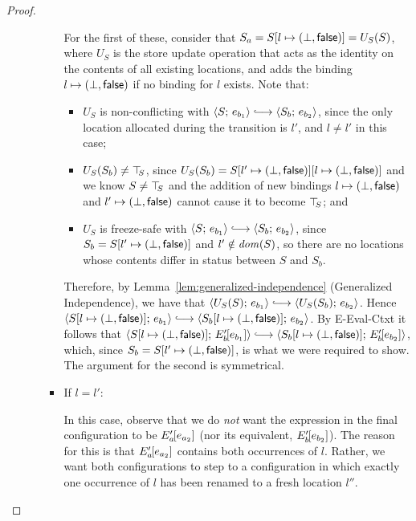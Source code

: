 \begin{proof}
\begin{enumerate}
\begin{enumerate}
\begin{itemize}
          For the first of these, consider that $S_a =
          S[l \mapsto (\bot, \textsf{false})] = U_S(S)$, where $U_S$ is
          the store update operation that acts as the identity on the
          contents of all existing locations, and adds the binding
          $l \mapsto (\bot, \textsf{false})$ if no binding for $l$
          exists.  Note that:
          \begin{itemize}
          \item $U_S$ is non-conflicting with $\config{S}{e_{b_1}}
            \parstepsto \config{S_b}{e_{b_2}}$, since the only
            location allocated during the transition is $l'$, and $l
            \neq l'$ in this case;
          \item $U_S(S_b) \neq \top\hspace{-0.85mm}_{S}$, since $U_S(S_b) =
            S[l' \mapsto (\bot, \textsf{false})][l \mapsto (\bot, \textsf{false})]$
            and we know $S \neq \top\hspace{-0.85mm}_{S}$ and the addition of new
            bindings $l \mapsto (\bot, \textsf{false})$ and
            $l' \mapsto (\bot, \textsf{false})$ cannot cause it to
            become $\top\hspace{-0.85mm}_{S}$; and
          \item $U_S$ is freeze-safe with $\config{S}{e_{b_1}}
            \parstepsto \config{S_b}{e_{b_2}}$, since $S_b =
            S[l' \mapsto (\bot, \textsf{false})]$ and $l' \notin \mathit{dom}(S)$,
            so there are no locations whose contents differ in status
            between $S$ and $S_b$.
          \end{itemize}

          Therefore, by Lemma~\ref{lem:generalized-independence}
          (Generalized Independence), we have that
          $\config{U_S(S)}{e_{b_1}} \parstepsto
          \config{U_S(S_b)}{e_{b_2}}$.  Hence
          $\config{\extS{S}{l}{\bot}{\frozenfalse}}{e_{b_1}}
          \parstepsto
          \config{\extS{S_b}{l}{\bot}{\frozenfalse}}{e_{b_2}}$.  By
                 {\sc E-Eval-Ctxt} it follows that
                 $\config{\extS{S}{l}{\bot}{\frozenfalse}}{\evalctxt{E'_b}{e_{b_1}}}
                 \parstepsto
                 \config{\extS{S_b}{l}{\bot}{\frozenfalse}}{\evalctxt{E'_b}{e_{b_2}}}$,
                 which, since $S_b =
                 S[l' \mapsto (\bot, \textsf{false})]$, is what we were
                 required to show.  The argument for the second is
                 symmetrical.

        \item If $l = l'$:

          In this case, observe that we do \emph{not} want the
          expression in the final configuration to be
          $E'_a\hspace{-1mm}\left[e_{a_2}\right]$ (nor its equivalent,
          $E'_b\hspace{-1mm}\left[e_{b_2}\right]$).  The reason for this is that
          $E'_a\hspace{-1mm}\left[e_{a_2}\right]$ contains both occurrences of $l$.
          Rather, we want both configurations to step to a
          configuration in which exactly one occurrence of $l$ has
          been renamed to a fresh location $l''$.


\end{itemize}
\end{enumerate}
\end{enumerate}
\end{proof}
